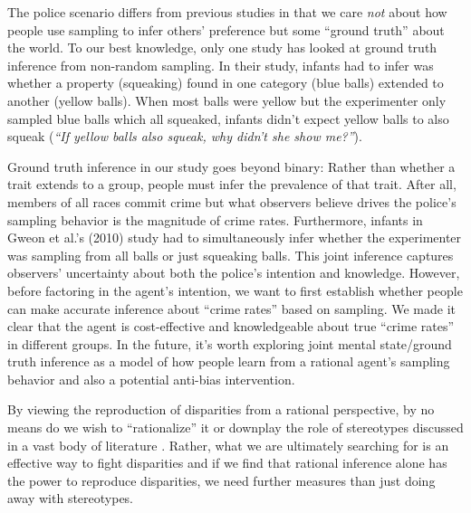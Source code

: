 \documentclass[10pt,letterpaper]{article}
\begin{document}
The police scenario differs from previous studies in that we care \emph{not} about how people use sampling to infer others' preference but some ``ground truth'' about the world. To our best knowledge, only one study \citep*{gweon2010infants} has looked at ground truth inference from non-random sampling. In their study, infants had to infer was whether a property (squeaking) found in one category (blue balls) extended to another (yellow balls). When most balls were yellow but the experimenter only sampled blue balls which all squeaked, infants didn't expect yellow balls to also squeak (\emph{``If yellow balls also squeak, why didn't she show me?''}). 

Ground truth inference in our study goes beyond binary: Rather than whether a trait extends to a group, people must infer the prevalence of that trait. After all, members of all races commit crime but what observers believe drives the police's sampling behavior is the magnitude of crime rates. Furthermore, infants in Gweon et al.'s (2010) study had to simultaneously infer whether the experimenter was sampling from all balls or just squeaking balls. This joint inference captures observers' uncertainty about both the police's intention and knowledge. However, before factoring in the agent's intention, we want to first establish whether people can make accurate inference about ``crime rates'' based on sampling. We made it clear that the agent is cost-effective and knowledgeable about true ``crime rates'' in different groups. In the future, it's worth exploring joint mental state/ground truth inference as a model of how people learn from a rational agent's sampling behavior and also a potential anti-bias intervention.

By viewing the reproduction of disparities from a rational perspective, by no means do we wish to ``rationalize'' it or downplay the role of stereotypes discussed in a vast body of literature \citep*[e.g.,][]{eberhardt2004seeing,payne2001prejudice}. Rather, what we are ultimately searching for is an effective way to fight disparities and if we find that rational inference alone has the power to reproduce disparities, we need further measures than just doing away with stereotypes.
\end{document}
